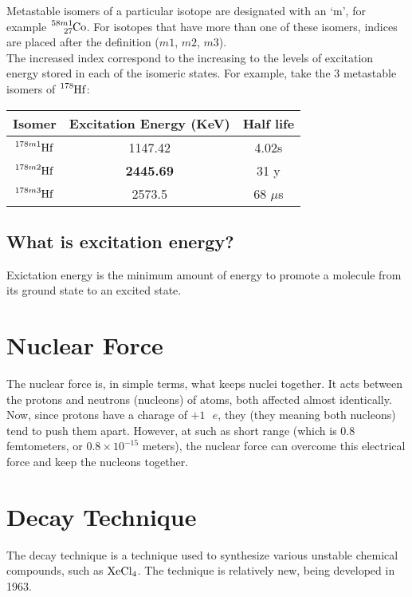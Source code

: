 \documentclass{article}
\begin{document}
\begin{multicols*}{2}
    Metastable isomers of a particular isotope are designated with an `m',
    for example $\ce{^{58m1}_{27}Co}$. For isotopes that have more than one
    of these isomers, indices are placed after the definition ($m1$, $m2$,
    $m3$).\\

    The increased index correspond to the increasing to the levels of excitation
    energy stored in each of the isomeric states. For example, take the $3$
    metastable isomers of $\ce{^{178}Hf}$:\\

    \begin{tabular}{|c|c|c|}
      \hline
      Isomer & Excitation Energy (KeV) & Half life \\
      \hline
      $\ce{^{178m1}Hf}$ & 1147.42 & 4.02s \\
      $\ce{^{178m2}Hf}$ & \textbf{2445.69} & 31 y \\
      $\ce{^{178m3}Hf}$ & 2573.5 & 68 $\mu$s \\
      \hline
    \end{tabular}

    \subsection{What is excitation energy?}
    Exictation energy is the minimum amount of energy to promote a molecule
    from its ground state to an excited state.


    \section{Nuclear Force}
    The nuclear force is, in simple terms, what keeps nuclei together. It
    acts between the protons and neutrons (nucleons) of atoms, both affected
    almost identically.\\

    Now, since protons have a charage of $+1\text{ }e$, they (they meaning
    both nucleons) tend to push them apart. However, at such as short range
    (which is $0.8$ femtometers, or $0.8 \times 10^{-15}$ meters), the nuclear
    force can overcome this electrical force and keep the nucleons together.

    \section{Decay Technique}
    The decay technique is a technique used to synthesize various unstable chemical
    compounds, such as $\ce{XeCl4}$. The technique is relatively new, being developed
    in 1963.


\end{multicols*}
\end{document}
